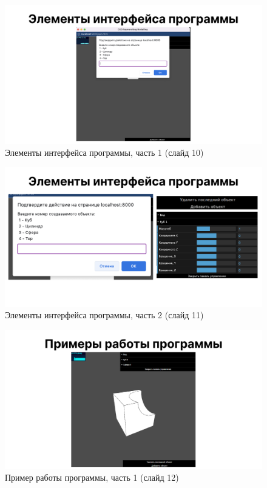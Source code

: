 \begin{figure}[h]
	\centering
	\captionsetup{justification=centering}
	\includegraphics[width=150mm]{img/slide10.png}
	\caption{Элементы интерфейса программы, часть 1 (слайд 10)}
	\label{fig:slide-10}
\end{figure}

\begin{figure}[h]
	\centering
	\captionsetup{justification=centering}
	\includegraphics[width=150mm]{img/slide11.png}
	\caption{Элементы интерфейса программы, часть 2 (слайд 11)}
	\label{fig:slide-11}
\end{figure}

\begin{figure}[h]
	\centering
	\captionsetup{justification=centering}
	\includegraphics[width=150mm]{img/slide12.png}
	\caption{Пример работы программы, часть 1 (слайд 12)}
	\label{fig:slide-12}
\end{figure}

